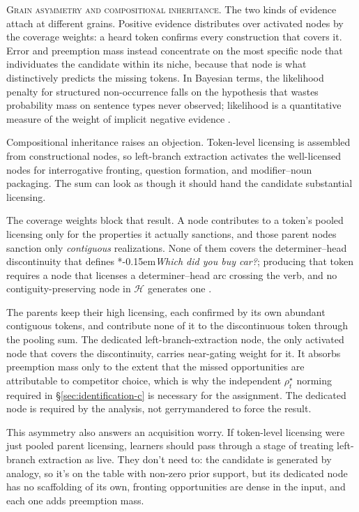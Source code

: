 \documentclass[12pt,letterpaper]{article}
\newcommand{\mention}[1]{\textit{#1}}
\newcommand{\judgesep}{\kern-0.15em}
\newcommand{\ungram}[1]{*\judgesep#1}
\begin{document}
\noindent\textsc{Grain asymmetry and compositional inheritance.} The two kinds of
evidence attach at different grains. Positive evidence distributes over
activated nodes by the coverage weights: a heard token confirms every
construction that covers it. Error and preemption mass instead concentrate on
the most specific node that individuates the candidate within its niche,
because that node is what distinctively predicts the missing tokens. In
Bayesian terms, the likelihood penalty for structured non-occurrence falls on
the hypothesis that wastes probability mass on sentence types never observed;
likelihood is a quantitative measure of the weight of implicit negative
evidence \autocite{PerforsEtAl2011}.

Compositional inheritance raises an objection. Token-level licensing is assembled from
constructional nodes, so left-branch extraction activates the well-licensed
nodes for interrogative fronting, question formation, and modifier--noun
packaging. The sum can look as though it should hand the candidate substantial
licensing.

The coverage weights block that result. A node contributes to a token's pooled
licensing only for the properties it actually sanctions, and those parent nodes
sanction only \emph{contiguous} realizations. None of them covers the
determiner--head discontinuity that defines
\ungram{\mention{Which did you buy car?}}; producing that token requires a node
that licenses a determiner--head arc crossing the verb, and no
contiguity-preserving node in $\mathcal{H}$ generates one
\autocite{reynolds2026lbe}.

The parents keep their high licensing, each confirmed by its own abundant
contiguous tokens, and contribute none of it to the discontinuous token through
the pooling sum. The dedicated left-branch-extraction node, the only activated
node that covers the discontinuity, carries near-gating weight for it. It absorbs
preemption mass only to the extent that the missed opportunities are attributable
to competitor choice, which is why the independent $\rho_t^\star$ norming
required in \S\ref{sec:identification-c} is necessary for the assignment.
The dedicated node is required by the analysis, not gerrymandered to force the
result.

This asymmetry also answers an acquisition worry. If token-level licensing were
just pooled parent licensing, learners should pass through a stage of treating
left-branch extraction as live. They don't need to: the candidate is generated
by analogy, so it's on the table with non-zero prior support, but its dedicated
node has no scaffolding of its own, fronting opportunities are dense in the
input, and each one adds preemption mass.
\end{document}
